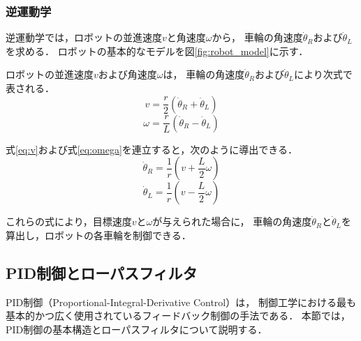 \subsubsection{逆運動学}
逆運動学では，ロボットの並進速度$v$と角速度$\omega$から，
車輪の角速度$\dot{\theta}_R$および$\dot{\theta}_L$を求める．
ロボットの基本的なモデルを図\ref{fig:robot_model}に示す．

ロボットの並進速度$v$および角速度$\omega$は，
車輪の角速度$\dot{\theta}_R$および$\dot{\theta}_L$により次式で表される．
\begin{equation}
    v = \frac{r}{2} (\dot{\theta}_R + \dot{\theta}_L)
    \label{eq:v}
\end{equation}
\begin{equation}
    \omega = \frac{r}{L} (\dot{\theta}_R - \dot{\theta}_L)
    \label{eq:omega}
\end{equation}

式\eqref{eq:v}および式\eqref{eq:omega}を連立すると，次のように導出できる．
\begin{equation}
    \dot{\theta}_R = \frac{1}{r} (v + \frac{L}{2} \omega)
    \label{eq:theta_R}
\end{equation}
\begin{equation}
    \dot{\theta}_L = \frac{1}{r} (v - \frac{L}{2} \omega)
    \label{eq:theta_L}
\end{equation}

これらの式により，目標速度$v$と$\omega$が与えられた場合に，
車輪の角速度$\dot{\theta}_R$と$\dot{\theta}_L$を算出し，ロボットの各車輪を制御できる．

\subsection{PID制御とローパスフィルタ}
PID制御（Proportional-Integral-Derivative Control）は，
制御工学における最も基本的かつ広く使用されているフィードバック制御の手法である．
本節では，PID制御の基本構造とローパスフィルタについて説明する．

